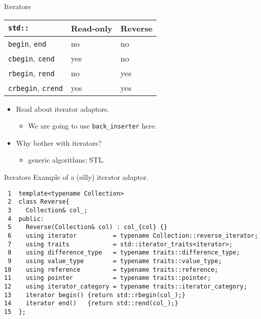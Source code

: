 \documentclass[presentation]{beamer}
\begin{document}
\begin{frame}[label={sec:orgb1a5ca7},fragile]{Iterators}
 \begin{center}
\begin{tabular}{lll}
\texttt{std::} & Read-only & Reverse\\
\hline
\texttt{begin}, \texttt{end} & no & no\\
\texttt{cbegin}, \texttt{cend} & yes & no\\
\texttt{rbegin}, \texttt{rend} & no & yes\\
\texttt{crbegin}, \texttt{crend} & yes & yes\\
\end{tabular}
\end{center}

\begin{itemize}
\item Read about iterator adaptors.
\begin{itemize}
\item We are going to use \texttt{back\_inserter} here.
\end{itemize}
\item Why bother with iterators?
\begin{itemize}
\item generic algorithms; STL.
\end{itemize}
\end{itemize}
\end{frame}
\begin{frame}[label={sec:orge94ca67},fragile]{Iterators}
 Example of a (silly) iterator adaptor.
\begin{verbatim}
 1  template<typename Collection>
 2  class Reverse{
 3    Collection& col_;
 4  public:
 5    Reverse(Collection& col) : col_{col} {}
 6    using iterator          = typename Collection::reverse_iterator;
 7    using traits            = std::iterator_traits<iterator>;
 8    using difference_type   = typename traits::difference_type;
 9    using value_type        = typename traits::value_type;
10    using reference         = typename traits::reference;
11    using pointer           = typename traits::pointer;
12    using iterator_category = typename traits::iterator_category;
13    iterator begin() {return std::rbegin(col_);}
14    iterator end()   {return std::rend(col_);}
15  };
\end{verbatim}
\end{frame}
\end{document}
